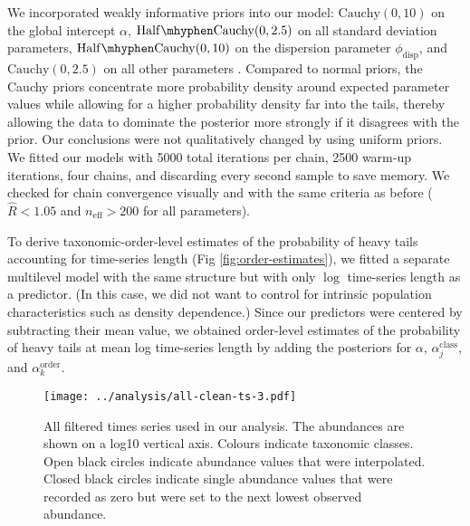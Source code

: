 We incorporated weakly informative priors into our model: $\mathrm{Cauchy}(0,
10)$ on the global intercept $\alpha$, $\mathrm{Half\mhyphen Cauchy}(0, 2.5)$ on
all standard deviation parameters, $\mathrm{Half\mhyphen Cauchy}(0, 10)$ on the
dispersion parameter $\phi_\mathrm{disp}$, and $\mathrm{Cauchy}(0, 2.5)$ on all
other parameters \citep{gelman2006c, gelman2008d}. Compared to normal priors,
the Cauchy priors concentrate more probability density around expected parameter
values while allowing for a higher probability density far into the tails, thereby
allowing the data to dominate the posterior more strongly if it disagrees with
the prior. Our conclusions were not qualitatively changed by using uniform
priors. We fitted our models with 5000 total iterations per chain, 2500 warm-up
iterations, four chains, and discarding every second sample to save memory. We
checked for chain convergence visually and with the same criteria as before
($\widehat{R} < 1.05$ and $n_\mathrm{eff} >200$ for all parameters).

To derive taxonomic-order-level estimates of the probability of heavy tails
accounting for time-series length (Fig \ref{fig:order-estimates}), we fitted
a separate multilevel model with the same structure but with only $\log$
time-series length as a predictor. (In this case, we did not want to control
for intrinsic population characteristics such as density dependence.) Since our
predictors were centered by subtracting their mean value, we obtained
order-level estimates of the probability of heavy tails at mean log time-series
length by adding the posteriors for $\alpha$, $\alpha^\mathrm{class}_j$, and
$\alpha^\mathrm{order}_k$.





\clearpage
\renewcommand{\thetable}{S\arabic{table}}
\setcounter{table}{0}

\clearpage


\renewcommand{\thefigure}{S\arabic{figure}}
\setcounter{figure}{0}

\begin{figure}[htbp]
\begin{center}
\texttt{[image: ../analysis/all-clean-ts-3.pdf]}
\caption{
  All filtered times series used in our analysis. The abundances are shown on
  a log10 vertical axis. Colours indicate taxonomic classes. Open black circles
  indicate abundance values that were interpolated. Closed black circles
  indicate single abundance values that were recorded as zero but were set to
  the next lowest observed abundance.
}
    \label{fig:all-ts}
\end{center}
\end{figure}

